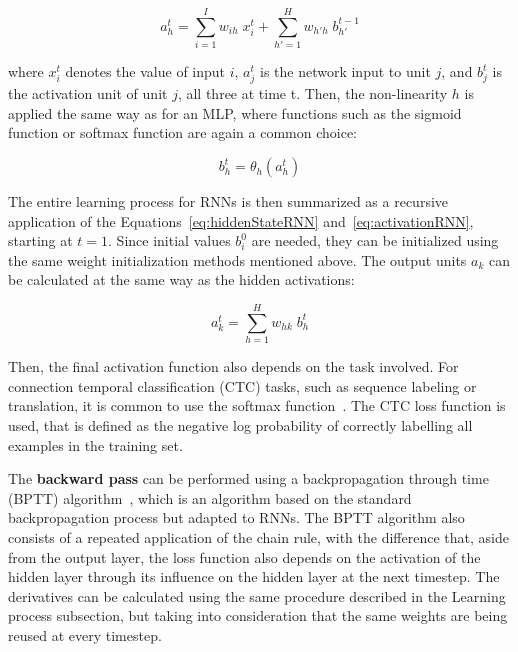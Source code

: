 \begin{equation} \label{eq:hiddenStateRNN}
    a_h^t = \sum_{i=1}^I w_{ih} \; x_i^t + \sum_{h'=1}^H w_{h'h} \; b_{h'}^{t-1}	
\end{equation}

where $x_i^t$ denotes the value of input $i$, $a_j^t$ is the network input to unit $j$, and 
$b_j^t$ is the activation unit of unit $j$, all three at time t. Then, the non-linearity $h$ 
is applied the same way as for an MLP, where functions such as the sigmoid function or 
softmax function are again a common choice:

\begin{equation} \label{eq:activationRNN}
    b_h^t = \theta_h(a_h^t)
\end{equation}

The entire learning process for RNNs is then summarized as a recursive application of the 
Equations~\ref{eq:hiddenStateRNN} and~\ref{eq:activationRNN}, starting at $t =1$. Since 
initial values $b_i^0$ are needed, they can be initialized using the same weight 
initialization methods mentioned above. The output units $a_k$ can be calculated at the same way 
as the hidden activations:

\begin{equation} \label{eq:hiddenStateRNN}
    a_k^t = \sum_{h=1}^H w_{hk} \; b_{h}^{t}	
\end{equation}

Then, the final activation function also depends on the task involved. For connection 
temporal classification (CTC) tasks, such as sequence labeling or translation, it is common 
to use the softmax function~\cite{appendix:graves2006connectionist}. The CTC loss function is 
used, that is defined as the negative log probability of correctly labelling all examples in 
the training set.

The \textbf{backward pass} can be performed using a backpropagation through time (BPTT) 
algorithm~\cite{appendix:williams1995gradient, semPar:werbos1990}, which is an algorithm 
based on the standard backpropagation process but adapted to RNNs. The BPTT algorithm also 
consists of a repeated application of the chain rule, with the difference that, aside from 
the output layer, the loss function also depends on the activation of the hidden layer 
through its influence on the hidden layer at the next timestep. The derivatives can be 
calculated using the same procedure described in the Learning process subsection, but taking 
into consideration that the same weights are being reused at every timestep.

